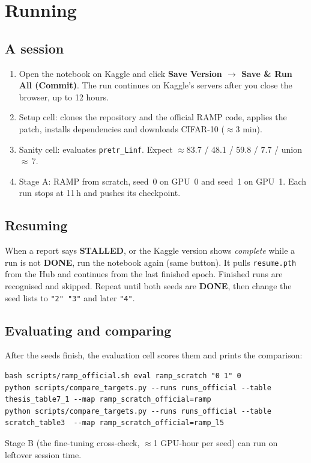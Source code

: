 \documentclass[11pt,a4paper]{article}
\newcommand{\code}[1]{\texttt{\small #1}}
\begin{document}
\section{Running}

\subsection{A session}
\begin{enumerate}
  \item Open the notebook on Kaggle and click \textbf{Save Version $\rightarrow$ Save \& Run All (Commit)}.
        The run continues on Kaggle's servers after you close the browser, up to 12 hours.
  \item Setup cell: clones the repository and the official RAMP code, applies the patch, installs
        dependencies and downloads CIFAR-10 ($\approx$3 min).
  \item Sanity cell: evaluates \code{pretr\_Linf}. Expect $\approx$83.7 / 48.1 / 59.8 / 7.7 / union $\approx$\,7.
  \item Stage A: RAMP from scratch, seed~0 on GPU~0 and seed~1 on GPU~1. Each run stops at 11\,h and
        pushes its checkpoint.
\end{enumerate}

\subsection{Resuming}
When a report says \textbf{STALLED}, or the Kaggle version shows \emph{complete} while a run is not
\textbf{DONE}, run the notebook again (same button). It pulls \code{resume.pth} from the Hub and
continues from the last finished epoch. Finished runs are recognised and skipped. Repeat until both
seeds are \textbf{DONE}, then change the seed lists to \code{"2" "3"} and later \code{"4"}.

\subsection{Evaluating and comparing}
After the seeds finish, the evaluation cell scores them and prints the comparison:
\begin{lstlisting}
bash scripts/ramp_official.sh eval ramp_scratch "0 1" 0
python scripts/compare_targets.py --runs runs_official --table thesis_table7_1 --map ramp_scratch_official=ramp
python scripts/compare_targets.py --runs runs_official --table scratch_table3  --map ramp_scratch_official=ramp_l5
\end{lstlisting}
Stage B (the fine-tuning cross-check, $\approx$1 GPU-hour per seed) can run on leftover session time.
\end{document}
